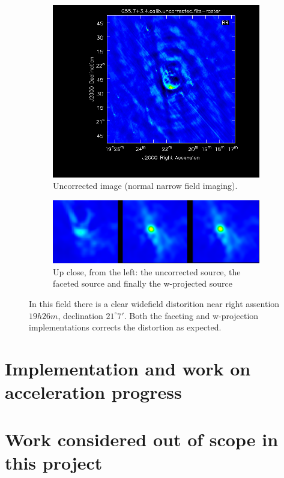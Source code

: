 \documentclass[a4paper,10pt]{article}
\begin{document}
\begin{figure}[h!]
\begin{subfigure}[b]{0.49\textwidth}
 \end{subfigure}
 \begin{subfigure}[b]{0.49\textwidth}
    \centering
    \includegraphics[width=\textwidth]{images/uncorrected.png}
    \caption{Uncorrected image (normal narrow field imaging).}
 \end{subfigure}
 \begin{subfigure}[b]{0.49\textwidth}
    \centering
    \includegraphics[width=\textwidth]{images/corrections.png}
    \caption{Up close, from the left: the uncorrected source, the faceted source and 
    finally the w-projected source}
 \end{subfigure}
 \caption[Supernova reminant G55.7+3.4]{In this field there is a clear widefield distorition near
 right assention $19h26m$, declination $21^\circ7'$. Both the faceting and w-projection
 implementations corrects the distortion as expected.}
 \label{FIG_SUPERNOVA}
\end{figure}
\section{Implementation and work on acceleration progress}

\section{Work considered out of scope in this project}

\pagebreak
{}

\end{document}
